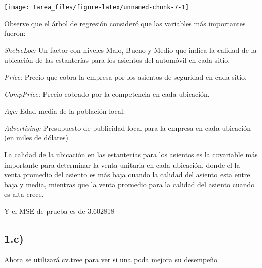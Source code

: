 \documentclass[
]{article}
\newenvironment{Shaded}{\begin{snugshade}}{\end{snugshade}}
\newcommand{\DataTypeTok}[1]{\textcolor[rgb]{0.13,0.29,0.53}{#1}}
\newcommand{\DecValTok}[1]{\textcolor[rgb]{0.00,0.00,0.81}{#1}}
\newcommand{\KeywordTok}[1]{\textcolor[rgb]{0.13,0.29,0.53}{\textbf{#1}}}
\newcommand{\NormalTok}[1]{#1}
\newcommand{\OperatorTok}[1]{\textcolor[rgb]{0.81,0.36,0.00}{\textbf{#1}}}
\newcommand{\StringTok}[1]{\textcolor[rgb]{0.31,0.60,0.02}{#1}}
\begin{document}
\begin{center}\texttt{[image: Tarea\_files/figure-latex/unnamed-chunk-7-1]} \end{center}

Observe que el árbol de regresión consideró que las variables más
importantes fueron:

\emph{ShelveLoc:} Un factor con niveles Malo, Bueno y Medio que indica
la calidad de la ubicación de las estanterías para los asientos del
automóvil en cada sitio.

\emph{Price:} Precio que cobra la empresa por los asientos de seguridad
en cada sitio.

\emph{CompPrice:} Precio cobrado por la competencia en cada ubicación.

\emph{Age:} Edad media de la población local.

\emph{Advertising:} Presupuesto de publicidad local para la empresa en
cada ubicación (en miles de dólares)

La calidad de la ubicación en las estanterías para los asientos es la
covariable más importante para determinar la venta unitaria en cada
ubicación, donde el la venta promedio del asiento es más baja cuando la
calidad del asiento esta entre baja y media, mientras que la venta
promedio para la calidad del asiento cuando es alta crece.

\begin{Shaded}
\end{Shaded}

Y el MSE de prueba es de 3.602818

\hypertarget{c}{%
\subsection{1.c)}\label{c}}

Ahora se utilizará cv.tree para ver si una poda mejora su desempeño
\end{document}
